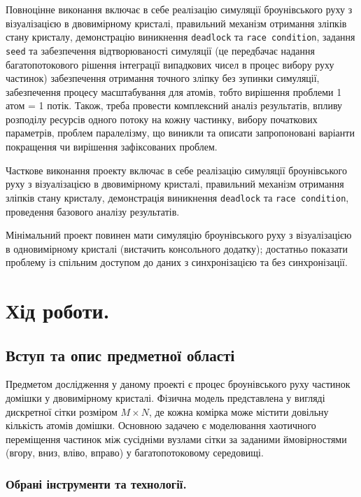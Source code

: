 \documentclass[14pt, a4paper]{extreport}
\begin{document}
	Повноцінне виконання включає в себе реалізацію симуляції броунівського руху з візуалізацією в двовимірному кристалі, правильний механізм отримання зліпків стану кристалу, демонстрацію виникнення \texttt{deadlock} та \texttt{race condition}, задання \texttt{seed} та забезпечення відтворюваності симуляції (це передбачає надання багатопотокового рішення інтеграції випадкових чисел в процес вибору руху частинок) забезпечення отримання точного зліпку без зупинки симуляції, забезпечення процесу масштабування для атомів, тобто вирішення ​проблеми 1 атом = 1 потік. Також, треба провести комплексний аналіз результатів, впливу розподілу ресурсів одного потоку на кожну частинку, вибору початкових параметрів, проблем паралелізму, що виникли та описати запропоновані варіанти покращення чи вирішення зафіксованих проблем.
	
	Часткове виконання проекту включає в себе реалізацію симуляції броунівського руху з візуалізацією в двовимірному кристалі, правильний механізм отримання зліпків стану кристалу, демонстрація виникнення \texttt{deadlock} та \texttt{race condition}, проведення базового аналізу результатів.
	
	Мінімальний проект повинен мати симуляцію броунівського руху з візуалізацією в одновимірному кристалі (вистачить консольного додатку); достатньо показати проблему із
	спільним доступом до даних з синхронізацією та без синхронізації.
	
	\section*{Хід роботи.}
	
	\subsection{Вступ та опис предметної області}
	
	Предметом дослідження у даному проекті є процес броунівського руху частинок домішки у двовимірному кристалі. Фізична модель представлена у вигляді дискретної сітки розміром $M \times N$, де кожна комірка може містити довільну кількість атомів домішки. Основною задачею є моделювання хаотичного переміщення частинок між сусідніми вузлами сітки за заданими ймовірностями (вгору, вниз, вліво, вправо) у багатопотоковому середовищі.
	
	\subsubsection{Обрані інструменти та технології.}
	
\end{document}
